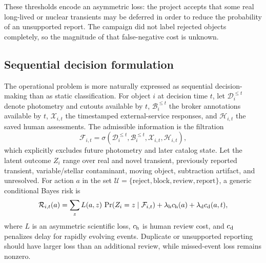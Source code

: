 \documentclass[11pt]{article}
\begin{document}
These thresholds encode an asymmetric loss: the project accepts that some real long-lived or nuclear transients may be deferred in order to reduce the probability of an unsupported report. The campaign did not label rejected objects completely, so the magnitude of that false-negative cost is unknown.

\subsection{Sequential decision formulation}
\label{sec:decision-theory}

The operational problem is more naturally expressed as sequential decision-making than as static classification. For object $i$ at decision time $t$, let $\mathcal{D}_{i}^{\leq t}$ denote photometry and cutouts available by $t$, $\mathcal{B}_{i}^{\leq t}$ the broker annotations available by $t$, $\mathcal{X}_{i,t}$ the timestamped external-service responses, and $\mathcal{H}_{i,t}$ the saved human assessments. The admissible information is the filtration
\begin{equation}
  \mathcal{F}_{i,t}=\sigma\!\left(\mathcal{D}_{i}^{\leq t},
  \mathcal{B}_{i}^{\leq t},\mathcal{X}_{i,t},\mathcal{H}_{i,t}\right),
\label{eq:filtration}
\end{equation}
which explicitly excludes future photometry and later catalog state. Let the latent outcome $Z_i$ range over real and novel transient, previously reported transient, variable/stellar contaminant, moving object, subtraction artifact, and unresolved. For action $a$ in the set $\mathcal{U}=\{\text{reject},\text{block},\text{review},\text{report}\}$, a generic conditional Bayes risk is
\begin{equation}
  \mathcal{R}_{i,t}(a)=
  \sum_{z}L(a,z)\,\Pr(Z_i=z\mid\mathcal{F}_{i,t})
  +\lambda_{\rm h}c_{\rm h}(a)+\lambda_{\rm d}c_{\rm d}(a,t),
\label{eq:bayes-risk}
\end{equation}
where $L$ is an asymmetric scientific loss, $c_{\rm h}$ is human review cost, and $c_{\rm d}$ penalizes delay for rapidly evolving events. Duplicate or unsupported reporting should have larger loss than an additional review, while missed-event loss remains nonzero.
\end{document}
